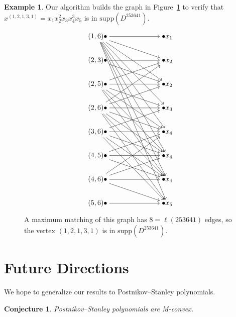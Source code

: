 \documentclass[11pt]{article}
\newtheorem{conjecture}[theo]{Conjecture}
\theoremstyle{definition}
\newtheorem{exam}[theo]{Example}
\numberwithin{equation}{section}
\newcommand{\supp}{\mathrm{supp}}
\begin{document}
\begin{exam}
Our algorithm builds the graph in Figure~\ref{fig:vanish} to verify that $x^{(1,2,1,3,1)} = x_1x_2^2x_3x_4^3x_5$ is in $\supp(D^{253641})$.
\end{exam}

    \begin{figure}[ht]

\[\begin{tikzcd}[cramped]
	{(1,6)\bullet} &&& {\bullet x_{1}} \\
	{(2,3)\bullet} &&& {\bullet x_{2}} \\
	{(2,5)\bullet} &&& {\bullet x_{2}} \\
	{(2,6)\bullet} &&& {\bullet x_{3}} \\
	{(3,6)\bullet} &&& {\bullet x_{4}} \\
	{(4,5)\bullet} &&& {\bullet x_{4}} \\
	{(4,6)\bullet} &&& {\bullet x_{4}} \\
	{(5,6)\bullet} &&& {\bullet x_{5}}
	\arrow[from=1-1, to=1-4]
	\arrow[from=1-1, to=2-4]
	\arrow[from=1-1, to=3-4]
	\arrow[from=1-1, to=4-4]
	\arrow[from=1-1, to=5-4]
	\arrow[from=1-1, to=6-4]
	\arrow[from=1-1, to=7-4]
	\arrow[from=1-1, to=8-4]
	\arrow[from=2-1, to=2-4]
	\arrow[from=2-1, to=3-4]
	\arrow[from=3-1, to=2-4]
	\arrow[from=3-1, to=3-4]
	\arrow[from=3-1, to=4-4]
	\arrow[from=3-1, to=5-4]
	\arrow[from=3-1, to=6-4]
	\arrow[from=3-1, to=7-4]
	\arrow[from=4-1, to=2-4]
	\arrow[from=4-1, to=3-4]
	\arrow[from=4-1, to=4-4]
	\arrow[from=4-1, to=5-4]
	\arrow[from=4-1, to=6-4]
	\arrow[from=4-1, to=7-4]
	\arrow[from=4-1, to=8-4]
	\arrow[from=5-1, to=4-4]
	\arrow[from=5-1, to=5-4]
	\arrow[from=5-1, to=6-4]
	\arrow[from=5-1, to=7-4]
	\arrow[from=5-1, to=8-4]
	\arrow[from=6-1, to=5-4]
	\arrow[from=6-1, to=6-4]
	\arrow[from=6-1, to=7-4]
	\arrow[from=7-1, to=5-4]
	\arrow[from=7-1, to=6-4]
	\arrow[from=7-1, to=7-4]
	\arrow[from=7-1, to=8-4]
	\arrow[from=8-1, to=8-4]
\end{tikzcd}\]

\caption{
    A maximum matching of this graph has $8 = \ell(253641)$ edges, so the vertex $(1,2,1,3,1)$ is in $\supp(D^{253641})$. 
}\label{fig:vanish}
\end{figure}


\section{Future Directions}
We hope to generalize our results to Postnikov--Stanley polynomials.
\begin{conjecture}
    Postnikov--Stanley polynomials are M-convex.
\end{conjecture}
\end{document}
